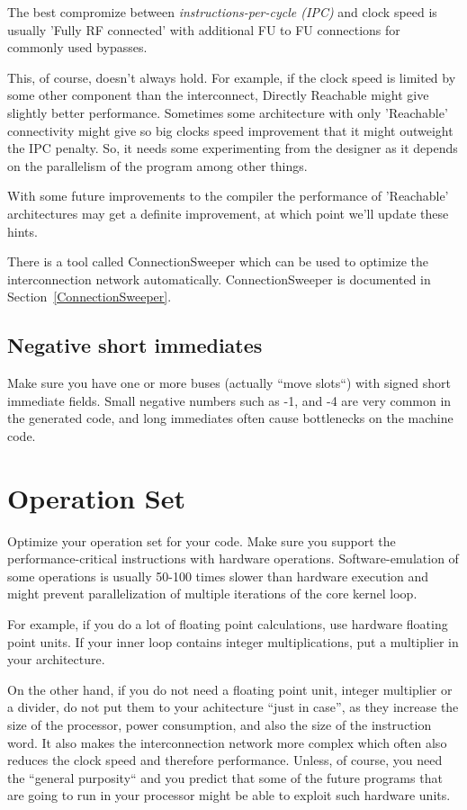 \documentclass[twoside]{tceusermanual}
\begin{document}
The best compromize between \textit{instructions-per-cycle (IPC)} and clock speed 
is usually 'Fully RF connected' with additional FU to FU connections for commonly 
used bypasses.

This, of course, doesn't always hold. For example, if the clock speed is limited by some
other component than the interconnect, Directly Reachable might give
slightly better performance. Sometimes some architecture with only 
'Reachable' connectivity might give so big clocks speed improvement that
it might outweight the IPC penalty. So, it needs some experimenting from
the designer as it depends on the parallelism of the program among other things.

With some future improvements to the compiler the performance of 'Reachable'
architectures may get a definite improvement, at which point we'll update these
hints.

There is a tool called ConnectionSweeper which can be used to optimize the
interconnection network automatically. ConnectionSweeper is documented in 
Section~\ref{ConnectionSweeper}.

\subsection{Negative short immediates}

Make sure you have one or more buses (actually ``move slots``) with signed short 
immediate fields. Small negative numbers such as -1, and -4 are very common in 
the generated code, and long immediates often cause bottlenecks on the machine code.

\section{Operation Set}

Optimize your operation set for your code. Make sure you support the 
performance-critical instructions with hardware operations. Software-emulation of 
some operations is usually 50-100 times slower than hardware execution and
might prevent parallelization of multiple iterations of the core kernel loop.

For example, if you do a lot of floating point calculations, use hardware floating 
point units. If your inner loop contains integer multiplications, put a multiplier in 
your architecture.

On the other hand, if you do not need a floating point unit, integer multiplier or 
a divider, do not put them to your achitecture ``just in case'', as they increase 
the size of the processor, power consumption, and also the size of the instruction 
word. It also makes the interconnection network more complex which often also 
reduces the clock speed and therefore performance. Unless, of course, you need
the ``general purposity`` and you predict that some of the future programs that 
are going to run in your processor might be able to exploit such hardware units.
\end{document}
